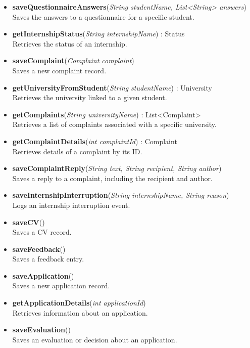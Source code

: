 \begin{itemize}
    \item \textbf{saveQuestionnaireAnswers}(\textit{String studentName, List<String> answers}) \\
    Saves the answers to a questionnaire for a specific student.

    \item \textbf{getInternshipStatus}(\textit{String internshipName}) : Status \\
    Retrieves the status of an internship.

    \item \textbf{saveComplaint}(\textit{Complaint complaint}) \\
    Saves a new complaint record.

    \item \textbf{getUniversityFromStudent}(\textit{String studentName}) : University \\
    Retrieves the university linked to a given student.

    \item \textbf{getComplaints}(\textit{String universityName}) : List<Complaint> \\
    Retrieves a list of complaints associated with a specific university.

    \item \textbf{getComplaintDetails}(\textit{int complaintId}) : Complaint \\
    Retrieves details of a complaint by its ID.

    \item \textbf{saveComplaintReply}(\textit{String text, String recipient, String author}) \\
    Saves a reply to a complaint, including the recipient and author.

    \item \textbf{saveInternshipInterruption}(\textit{String internshipName, String reason}) \\
    Logs an internship interruption event.

    \item \textbf{saveCV}() \\
    Saves a CV record.

    \item \textbf{saveFeedback}() \\
    Saves a feedback entry.

    \item \textbf{saveApplication}() \\
    Saves a new application record.

    \item \textbf{getApplicationDetails}(\textit{int applicationId}) \\
    Retrieves information about an application.

    \item \textbf{saveEvaluation}() \\
    Saves an evaluation or decision about an application.

\end{itemize}

